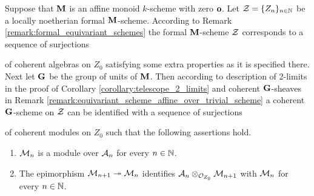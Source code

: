 \begin{remark}\label{remark:formal_equivariant_schemes}
Suppose that $\mathbf{M}$ is an affine monoid $k$-scheme with zero $\mathbf{o}$. Let ${\mathcal Z} = \{Z_n\}_{n\in {\mathbb N}}$ be a locally noetherian formal $\mathbf{M}$-scheme. According to Remark \ref{remark:formal_equivariant_schemes} the formal $\mathbf{M}$-scheme ${\mathcal Z}$ corresponds to a sequence of surjections
\begin{center}
\end{center}
of coherent algebras on $Z_0$ satisfying some extra properties as it is specified there. Next let $\mathbf{G}$ be the group of units of $\mathbf{M}$. Then according to description of 2-limits in the proof of Corollary \ref{corollary:telescope_2_limits} and coherent $\mathbf{G}$-sheaves in Remark \ref{remark:equivariant_scheme_affine_over_trivial_scheme} a coherent $\mathbf{G}$-scheme on ${\mathcal Z}$ can be identified with a sequence of surjections
\begin{center}
\end{center}
of coherent modules on $Z_0$ such that the following assertions hold.
\begin{enumerate}[label=\textbf{(\arabic*)}, leftmargin=3.0em]
\item ${\mathcal M}_n$ is a module over ${\mathcal A}_n$ for every $n\in {\mathbb N}$.
\item The epimorphism ${\mathcal M}_{n+1}\twoheadrightarrow {\mathcal M}_n$ identifies ${\mathcal A}_n\otimes_{{\mathcal O}_{Z_0}}{\mathcal M}_{n+1}$ with ${\mathcal M}_n$ for every $n\in {\mathbb N}$.

\end{enumerate}
\end{remark}
